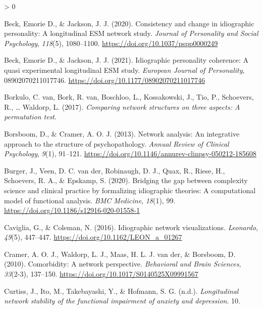 \documentclass[
  english,
  man]{apa6}
\newlength{\cslhangindent}
\newenvironment{CSLReferences}[2] %
 {%
  \setlength{\parindent}{0pt}
  \ifodd #1 \everypar{\setlength{\hangindent}{\cslhangindent}}\ignorespaces\fi
  \ifnum #2 > 0
  \setlength{\parskip}{#2\baselineskip}
  \fi
 }%
 {}
\begin{document}
\hypertarget{refs}{}
\begin{CSLReferences}{1}{0}
\leavevmode\hypertarget{ref-BeckJackson2020a}{}%
Beck, Emorie D., \& Jackson, J. J. (2020). Consistency and change in idiographic personality: A longitudinal ESM network study. \emph{Journal of Personality and Social Psychology}, \emph{118}(5), 1080--1100. \url{https://doi.org/10.1037/pspp0000249}

\leavevmode\hypertarget{ref-BeckJackson2021}{}%
Beck, Emorie D., \& Jackson, J. J. (2021). Idiographic personality coherence: A quasi experimental longitudinal ESM study. \emph{European Journal of Personality}, 08902070211017746. \url{https://doi.org/10.1177/08902070211017746}

\leavevmode\hypertarget{ref-vanBorkuloEtAl2017}{}%
Borkulo, C. van, Bork, R. van, Boschloo, L., Kossakowski, J., Tio, P., Schoevers, R., \ldots{} Waldorp, L. (2017). \emph{Comparing network structures on three aspects: A permutation test}.

\leavevmode\hypertarget{ref-BorsboomCramer2013}{}%
Borsboom, D., \& Cramer, A. O. J. (2013). Network analysis: An integrative approach to the structure of psychopathology. \emph{Annual Review of Clinical Psychology}, \emph{9}(1), 91--121. \url{https://doi.org/10.1146/annurev-clinpsy-050212-185608}

\leavevmode\hypertarget{ref-BurgerEtAl2020}{}%
Burger, J., Veen, D. C. van der, Robinaugh, D. J., Quax, R., Riese, H., Schoevers, R. A., \& Epskamp, S. (2020). Bridging the gap between complexity science and clinical practice by formalizing idiographic theories: A computational model of functional analysis. \emph{BMC Medicine}, \emph{18}(1), 99. \url{https://doi.org/10.1186/s12916-020-01558-1}

\leavevmode\hypertarget{ref-CavigliaColeman2016}{}%
Caviglia, G., \& Coleman, N. (2016). Idiographic network visualizations. \emph{Leonardo}, \emph{49}(5), 447--447. \url{https://doi.org/10.1162/LEON_a_01267}

\leavevmode\hypertarget{ref-CramerEtAl2010}{}%
Cramer, A. O. J., Waldorp, L. J., Maas, H. L. J. van der, \& Borsboom, D. (2010). Comorbidity: A network perspective. \emph{Behavioral and Brain Sciences}, \emph{33}(2-3), 137--150. \url{https://doi.org/10.1017/S0140525X09991567}

\leavevmode\hypertarget{ref-CurtissEtAl}{}%
Curtiss, J., Ito, M., Takebayashi, Y., \& Hofmann, S. G. (n.d.). \emph{Longitudinal network stability of the functional impairment of anxiety and depression}. 10.


\end{CSLReferences}
\end{document}
